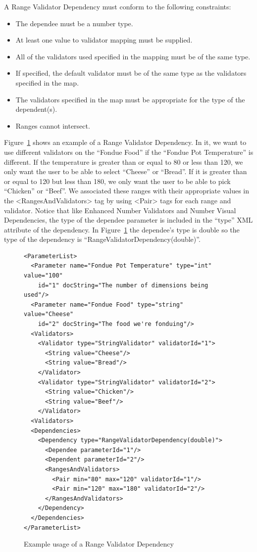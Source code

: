 A Range Validator Dependency must conform to the following constraints:
\begin{itemize}
\item The dependee must be a number type.
\item At least one value to validator mapping must be supplied.
\item All of the validators used specified in the mapping must be of the same type.
\item If specified, the default validator must be of the same type as the validators specified in the map.
\item The validators specified in the map must be appropriate for the type of the dependent(s).
\item Ranges cannot intersect.
\end{itemize}

Figure~\ref{RangeValiDepXML} shows an example of a Range Validator Dependency. In it, we want to use different validators
on the ``Fondue Food'' if the ``Fondue Pot Temperature'' is different. If the temperature is greater than or equal to 80 or less than 120,
we only want the user to be able to select ``Cheese'' or ``Bread''. If it is greater than or equal to 120 but less than 180, we only want the
user to be able to pick ``Chicken'' or ``Beef''. We associated these ranges with their appropriate values in the <RangesAndValidators> tag by
using <Pair> tags for each range and validator. Notice that like Enhanced Number Validators and Number Visual Dependencies, the type of the dependee parameter is 
included in the ``type'' XML attribute of the dependency. In Figure~\ref{RangeValiDepXML} the dependee's type is double so the type of the dependency is 
``RangeValidatorDependency(double)''.
\begin{figure}
\centering
{\footnotesize
\begin{Verbatim}
<ParameterList>
  <Parameter name="Fondue Pot Temperature" type="int" value="100"
    id="1" docString="The number of dimensions being used"/>
  <Parameter name="Fondue Food" type="string" value="Cheese"
    id="2" docString="The food we're fonduing"/>
  <Validators>
    <Validator type="StringValidator" validatorId="1">
      <String value="Cheese"/>
      <String value="Bread"/>
    </Validator>
    <Validator type="StringValidator" validatorId="2">
      <String value="Chicken"/>
      <String value="Beef"/>
    </Validator>
  <Validators>
  <Dependencies>
    <Dependency type="RangeValidatorDependency(double)">
      <Dependee parameterId="1"/>
      <Dependent parameterId="2"/>
      <RangesAndValidators>
        <Pair min="80" max="120" validatorId="1"/>
        <Pair min="120" max="180" validatorId="2"/>
      </RangesAndValidators>
    </Dependency>
  </Dependencies>
</ParameterList>
\end{Verbatim}
}
\caption{Example usage of a Range Validator Dependency}
\label{RangeValiDepXML}
\end{figure}

